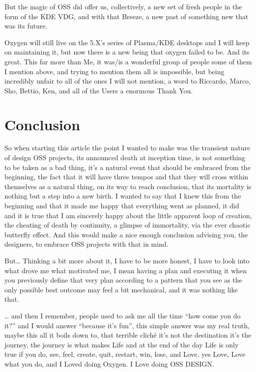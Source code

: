 But the magic of OSS did offer us, collectively, a new set of fresh people in the form of the KDE VDG, and with that Breeze, a new past of something new that was its future.

Oxygen will still live on the 5.X's series of Plasma/KDE desktops and I will keep on maintaining it, but now there is a new being that oxygen failed to be. And its great.
This far more than Me, it was/is a wonderful group of people some of them I mention above, and trying to mention them all is impossible, but being incredibly unfair to all of the ones I will not mention, a word to Riccardo, Marco, Sho, Bettio, Ken, and all of the Users a enormous Thank You. 

\section*{Conclusion}
So when starting this article the point I wanted to make was the transient nature of design OSS projects, its announced death at inception time, is not something to be taken as a bad thing, it's a natural event that should be embraced from the beginning, the fact that it will have three tempos and that they will cross within themselves as a natural thing, on its way to reach conclusion, that its mortality is nothing but a step into a new birth.
I wanted to say that I knew this from the beginning and that it made me happy that everything went as planned, it did and it is true that I am sincerely happy about the little apparent loop of creation, the cheating of death by continuity, a glimpse of immortality, via the ever chaotic butterfly effect. And this would make a nice enough conclusion advising you, the designers, to embrace OSS projects with that in mind.

But… Thinking a bit more about it, I have to be more honest, I have to look into what drove me what motivated me, I mean having a plan and executing it when you previously define that very plan according to a pattern that you see as the only possible best outcome may feel a bit mechanical, and it was nothing like that.

… and then I remember, people used to ask me all the time “how come you do it?” and I would answer “because it's fun”, this simple answer was my real truth, maybe this all it boils down to, that terrible cliché it's not the destination it's the journey, the journey is what makes Life and at the end of the day Life is only true if you do, see, feel, create, quit, restart, win, lose, and Love, yes Love, Love what you do, and I Loved doing Oxygen. I Love doing OSS DESIGN. 


